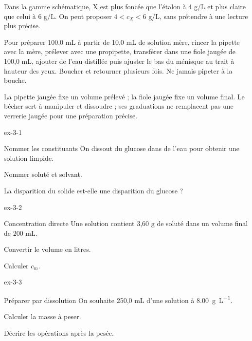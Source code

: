     \begin{exemple}Dans la gamme schématique, X est plus foncée que l'étalon à 4 g/L et plus claire que celui à 6 g/L. On peut proposer $4<c_X<6$ g/L, sans prétendre à une lecture plus précise.\end{exemple}
\begin{experience}Pour préparer 100,0 mL à partir de 10,0 mL de solution mère, rincer la pipette avec la mère, prélever avec une propipette, transférer dans une fiole jaugée de 100,0 mL, ajouter de l'eau distillée puis ajuster le bas du ménisque au trait à hauteur des yeux. Boucher et retourner plusieurs fois. Ne jamais pipeter à la bouche.\end{experience}
\begin{savoirfaire}La pipette jaugée fixe un volume prélevé ; la fiole jaugée fixe un volume final. Le bécher sert à manipuler et dissoudre ; ses graduations ne remplacent pas une verrerie jaugée pour une préparation précise.\end{savoirfaire}
\exercices
{}
\begin{blocLivre}{ex-3-1}\begin{exercice}[1]{Nommer les constituants}
On dissout du glucose dans de l’eau pour obtenir une solution limpide.
\begin{questions}
\item Nommer soluté et solvant.
\item La disparition du solide est-elle une disparition du glucose ?
\end{questions}
\end{exercice}\end{blocLivre}
\begin{blocLivre}{ex-3-2}\begin{exercice}[1]{Concentration directe}
Une solution contient 3,60 g de soluté dans un volume final de 200 mL.
\begin{questions}
\item Convertir le volume en litres.
\item Calculer $c_m$.
\end{questions}
\end{exercice}\end{blocLivre}
\begin{blocLivre}{ex-3-3}\begin{exercice}[1]{Préparer par dissolution}
On souhaite 250,0 mL d’une solution à \qty{8,00}{g.L^{-1}}.
\begin{questions}
\item Calculer la masse à peser.
\item Décrire les opérations après la pesée.
\end{questions}
\end{exercice}\end{blocLivre}
